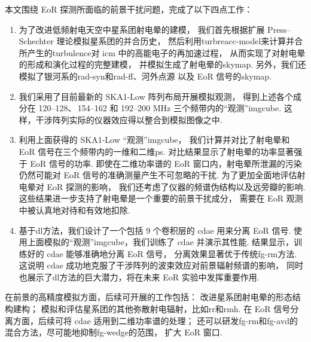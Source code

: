 
\begin{summary}

本文围绕 EoR 探测所面临的前景干扰问题，完成了以下四点工作：
\begin{enumerate}
\item
为了改进低频射电天空中星系团射电晕的建模，
我们首先根据扩展 Press--Schechter 理论模拟星系团的并合历史，
然后利用\ac{turbreacc-model}来计算并合所产生的\ac{turbulence}对 \ac{icm}
中的高能电子的再加速过程，
从而实现了对射电晕的形成和演化过程的完整建模，
并模拟生成了射电晕的\ac{skymap}.
另外，我们还模拟了银河系的\ac{rad-syn}和\ac{rad-ff}、河外点源
以及 EoR 信号的\ac{skymap}.

\item
我们采用了目前最新的 SKA1-Low 阵列布局开展模拟观测，
得到上述各个成分在 \numrange{120}{128}、\,\numrange{154}{162}
和 \numrange{192}{200} \si{\MHz} 三个频带内的\enquote{观测}\ac{imgcube}.
这样，干涉阵列实际的仪器效应得以整合到模拟图像之中.

\item
利用上面获得的 SKA1-Low \enquote{观测}\ac{imgcube}，
我们计算并对比了射电晕和 EoR 信号在三个频带内的一维和二维\ac{ps}.
对比结果显示了射电晕的功率显著强于 EoR 信号的功率.
即使在二维功率谱的 EoR 窗口内，射电晕所泄漏的污染仍然可能对
EoR 信号的准确测量产生不可忽略的干扰.
为了更加全面地评估射电晕对 EoR 探测的影响，
我们还考虑了仪器的频谱伪结构以及远旁瓣的影响.
这些结果进一步支持了射电晕是一个重要的前景干扰成分，
需要在 EoR 观测中被认真地对待和有效地扣除.

\item
基于\ac{dl}方法，我们设计了一个包括 9 个卷积层的 \ac{cdae} 用来分离 EoR 信号.
使用上面模拟的\enquote{观测}\ac{imgcube}，我们训练了 \ac{cdae} 并演示其性能.
结果显示，训练好的 \ac{cdae} 能够准确地分离 EoR 信号，
分离效果显著优于传统\ac{fg-rm}方法.
这说明 \ac{cdae} 成功地克服了干涉阵列的波束效应对前景辐射频谱的影响，
同时也展示了\ac{dl}方法的巨大潜力，将在未来 EoR 实验中发挥重要作用.
\end{enumerate}

在前景的高精度模拟方面，后续可开展的工作包括：
改进星系团射电晕的形态结构建构；
模拟和评估星系团的其他弥散射电辐射，比如\ac{rr}和\ac{rmh}.
在 EoR 信号分离方面，后续可将 \ac{cdae} 适用到二维功率谱的处理；
还可以研发\ac{fg-rm}和\ac{fg-avd}的混合方法，尽可能地抑制\ac{fg-wedge}的范围，
扩大 EoR 窗口.

\end{summary}
